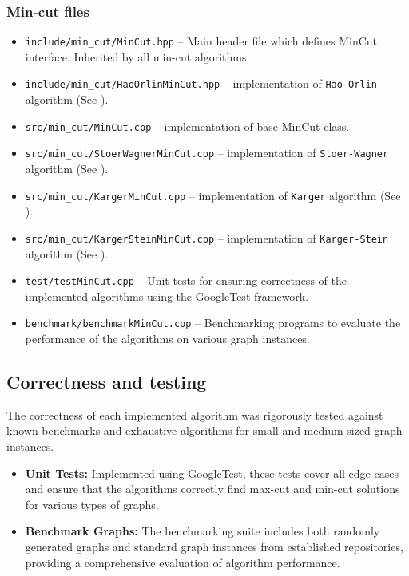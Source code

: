 \subsubsection{Min-cut files}

\begin{itemize}
    \item \texttt{include/min\_cut/MinCut.hpp} -- Main header file which defines MinCut interface. Inherited by all min-cut algorithms.
    \item \texttt{include/min\_cut/HaoOrlinMinCut.hpp} -- implementation of \texttt{Hao-Orlin} algorithm (See ).
    \item \texttt{src/min\_cut/MinCut.cpp} -- implementation of base MinCut class.
    \item \texttt{src/min\_cut/StoerWagnerMinCut.cpp} -- implementation of \texttt{Stoer-Wagner} algorithm (See ).
    \item \texttt{src/min\_cut/KargerMinCut.cpp} -- implementation of \texttt{Karger} algorithm (See ).
    \item \texttt{src/min\_cut/KargerSteinMinCut.cpp} -- implementation of \texttt{Karger-Stein} algorithm (See ).
    \item \texttt{test/testMinCut.cpp} -- Unit tests for ensuring correctness of the implemented algorithms using the GoogleTest framework.
    \item \texttt{benchmark/benchmarkMinCut.cpp} -- Benchmarking programs to evaluate the performance of the algorithms on various graph instances.
\end{itemize}

\subsection{Correctness and testing}

The correctness of each implemented algorithm was rigorously tested against known benchmarks and exhaustive algorithms for small and medium sized graph instances.

\begin{itemize}
    \item  \textbf{Unit Tests:} Implemented using GoogleTest, these tests cover all edge cases and ensure that the algorithms correctly find max-cut and min-cut solutions for various types of graphs.
    \item \textbf{Benchmark Graphs:} The benchmarking suite includes both randomly generated graphs and standard graph instances from established repositories, providing a comprehensive evaluation of algorithm performance.
\end{itemize}

